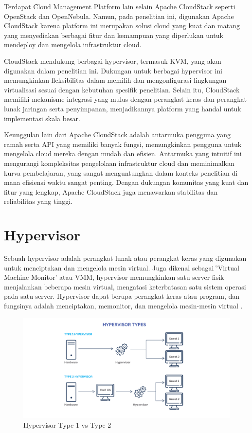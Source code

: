Terdapat \f{Cloud Management Platform} lain selain Apache CloudStack seperti OpenStack dan OpenNebula. Namun, pada penelitian ini, digunakan Apache CloudStack karena platform ini merupakan solusi cloud yang kuat dan matang yang menyediakan berbagai fitur dan kemampuan yang diperlukan untuk mendeploy dan mengelola infrastruktur cloud.

CloudStack mendukung berbagai hypervisor, termasuk KVM, yang akan digunakan dalam penelitian ini. Dukungan untuk berbagai hypervisor ini memungkinkan fleksibilitas dalam memilih dan mengonfigurasi lingkungan virtualisasi sesuai dengan kebutuhan spesifik penelitian. Selain itu, CloudStack memiliki mekanisme integrasi yang mulus dengan perangkat keras dan perangkat lunak jaringan serta penyimpanan, menjadikannya platform yang handal untuk implementasi skala besar.

Keunggulan lain dari Apache CloudStack adalah antarmuka pengguna yang ramah serta API yang memiliki banyak fungsi, memungkinkan pengguna untuk mengelola cloud mereka dengan mudah dan efisien. Antarmuka yang intuitif ini mengurangi kompleksitas pengelolaan infrastruktur cloud dan meminimalkan kurva pembelajaran, yang sangat menguntungkan dalam konteks penelitian di mana efisiensi waktu sangat penting. Dengan dukungan komunitas yang kuat dan fitur yang lengkap, Apache CloudStack juga menawarkan stabilitas dan reliabilitas yang tinggi.

\section{Hypervisor}
Sebuah hypervisor adalah perangkat lunak atau perangkat keras yang digunakan untuk menciptakan dan mengelola mesin virtual. Juga dikenal sebagai \f{'Virtual Machine Monitor'} atau VMM, hypervisor memungkinkan satu server fisik menjalankan beberapa mesin virtual, mengatasi keterbatasan satu sistem operasi pada satu server. Hypervisor dapat berupa perangkat keras atau program, dan fungsinya adalah menciptakan, memonitor, dan mengelola mesin-mesin virtual \cite{MacPherson_2023}.

\begin{figure}
	\centering
	\includegraphics[width=1\textwidth]
	{assets/pics/type-1-hypervisor-vs-type-2.png}
	\caption{Hypervisor Type 1 vs Type 2}
	\label{fig:HypervisorType1vsType2}
\end{figure}

